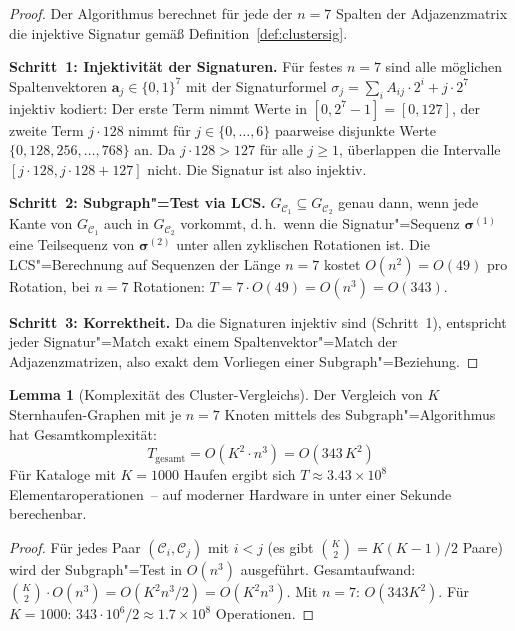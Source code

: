 ﻿\documentclass[a4paper,12pt]{article}
\theoremstyle{definition}
\newtheorem{lemma}{Lemma}
\begin{document}
\begin{proof}
    Der Algorithmus berechnet für jede der $n = 7$ Spalten der Adjazenzmatrix
    die injektive Signatur gemäß Definition~\ref{def:clustersig}.

    \textbf{Schritt~1: Injektivität der Signaturen.}
    Für festes $n = 7$ sind alle möglichen Spaltenvektoren
    $\mathbf{a}_j \in \{0,1\}^7$ mit der Signaturformel
    $\sigma_j = \sum_i A_{ij} \cdot 2^i + j \cdot 2^7$ injektiv kodiert:
    Der erste Term nimmt Werte in $[0, 2^7-1] = [0,127]$,
    der zweite Term $j \cdot 128$ nimmt für $j \in \{0,\ldots,6\}$
    paarweise disjunkte Werte $\{0, 128, 256, \ldots, 768\}$ an.
    Da $j \cdot 128 > 127$ für alle $j \geq 1$, überlappen die Intervalle
    $[j \cdot 128, j \cdot 128 + 127]$ nicht. Die Signatur ist also injektiv.

    \textbf{Schritt~2: Subgraph"=Test via LCS.}
    $G_{\mathcal{C}_1} \subseteq G_{\mathcal{C}_2}$ genau dann, wenn
    jede Kante von $G_{\mathcal{C}_1}$ auch in $G_{\mathcal{C}_2}$ vorkommt,
    d.\,h.\ wenn die Signatur"=Sequenz $\boldsymbol{\sigma}^{(1)}$ eine
    Teilsequenz von $\boldsymbol{\sigma}^{(2)}$ unter allen zyklischen
    Rotationen ist. Die LCS"=Berechnung auf Sequenzen der Länge $n = 7$
    kostet $O(n^2) = O(49)$ pro Rotation, bei $n = 7$ Rotationen:
    $T = 7 \cdot O(49) = O(n^3) = O(343)$.

    \textbf{Schritt~3: Korrektheit.}
    Da die Signaturen injektiv sind (Schritt~1), entspricht jeder
    Signatur"=Match exakt einem Spaltenvektor"=Match der Adjazenzmatrizen,
    also exakt dem Vorliegen einer Subgraph"=Beziehung. \qedhere
\end{proof}

\begin{lemma}[Komplexität des Cluster-Vergleichs]
\label{lem:cluster_komplex}
    Der Vergleich von $K$ Sternhaufen-Graphen mit je $n = 7$ Knoten
    mittels des Subgraph"=Algorithmus hat Gesamtkomplexität:
    \[
        T_{\text{gesamt}} = O(K^2 \cdot n^3) = O(343\,K^2)
    \]
    Für Kataloge mit $K = 1000$ Haufen ergibt sich
    $T \approx 3.43 \times 10^8$ Elementaroperationen~-- auf moderner
    Hardware in unter einer Sekunde berechenbar.
\end{lemma}

\begin{proof}
    Für jedes Paar $(\mathcal{C}_i, \mathcal{C}_j)$ mit
    $i < j$ (es gibt $\binom{K}{2} = K(K-1)/2$ Paare) wird der
    Subgraph"=Test in $O(n^3)$ ausgeführt.
    Gesamtaufwand: $\binom{K}{2} \cdot O(n^3) = O(K^2 n^3 / 2) = O(K^2 n^3)$.
    Mit $n = 7$: $O(343 K^2)$. Für $K=1000$:
    $343 \cdot 10^6 / 2 \approx 1.7 \times 10^8$ Operationen. \qedhere
\end{proof}
\end{document}
